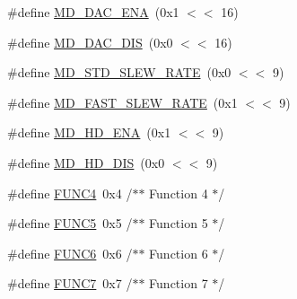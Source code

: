 \begin{DoxyCompactItemize}
\#define \hyperlink{group__IOCON__17XX__40XX_ga6b38cbeca37aeb7bcbf7fc66ba4ec65d}{M\-D\-\_\-\-D\-A\-C\-\_\-\-E\-N\-A}~(0x1 $<$$<$ 16)
\item 
\#define \hyperlink{group__IOCON__17XX__40XX_gaec6eb0c4c1101d5c5dc64ef56a5a5588}{M\-D\-\_\-\-D\-A\-C\-\_\-\-D\-I\-S}~(0x0 $<$$<$ 16)
\item 
\#define \hyperlink{group__IOCON__17XX__40XX_ga190b92c2bbf82f91768ad526aaadc441}{M\-D\-\_\-\-S\-T\-D\-\_\-\-S\-L\-E\-W\-\_\-\-R\-A\-T\-E}~(0x0 $<$$<$ 9)
\item 
\#define \hyperlink{group__IOCON__17XX__40XX_ga26dcdaed2ef64f84991cc59ae9370c80}{M\-D\-\_\-\-F\-A\-S\-T\-\_\-\-S\-L\-E\-W\-\_\-\-R\-A\-T\-E}~(0x1 $<$$<$ 9)
\item 
\#define \hyperlink{group__IOCON__17XX__40XX_ga4fb2c193dc83d6b18a8afad131b2e139}{M\-D\-\_\-\-H\-D\-\_\-\-E\-N\-A}~(0x1 $<$$<$ 9)
\item 
\#define \hyperlink{group__IOCON__17XX__40XX_ga324ed23a726e0788749899278b0ce61a}{M\-D\-\_\-\-H\-D\-\_\-\-D\-I\-S}~(0x0 $<$$<$ 9)
\item 
\#define \hyperlink{group__IOCON__17XX__40XX_ga769e96bef0ce818be7aa2cb0a0a67753}{F\-U\-N\-C4}~0x4				/$\ast$$\ast$ Function 4  $\ast$/
\item 
\#define \hyperlink{group__IOCON__17XX__40XX_gaa8d0feff604f4d347ce09d433de1b32d}{F\-U\-N\-C5}~0x5				/$\ast$$\ast$ Function 5  $\ast$/
\item 
\#define \hyperlink{group__IOCON__17XX__40XX_ga3070395c343da6e051c4ebbcd3185a87}{F\-U\-N\-C6}~0x6				/$\ast$$\ast$ Function 6	$\ast$/
\item 
\#define \hyperlink{group__IOCON__17XX__40XX_ga25318daff6c777173bc54d6eeac7cb83}{F\-U\-N\-C7}~0x7				/$\ast$$\ast$ Function 7	$\ast$/
\end{DoxyCompactItemize}
